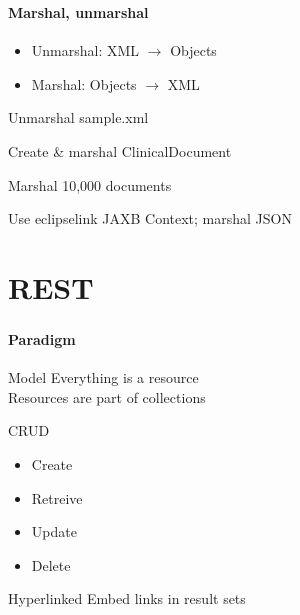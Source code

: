 \documentclass[handout]{beamer}
\begin{document}
\begin{frame}
	\frametitle{\insertsection}
	\framesubtitle{Marshal, unmarshal}
	\begin{definition}
		\begin{itemize}
			\item Unmarshal: XML $\rightarrow$ Objects
			\item Marshal: Objects $\rightarrow$ XML
		\end{itemize}
	\end{definition}
	\begin{semiverbatim}
		Unmarshal sample.xml
	\end{semiverbatim}
	\begin{semiverbatim}
		Create \& marshal ClinicalDocument
	\end{semiverbatim}
	\begin{semiverbatim}
		Marshal 10,000 documents
	\end{semiverbatim}
	\begin{semiverbatim}
		Use eclipselink JAXB Context; marshal JSON
	\end{semiverbatim}
\end{frame}

\section{REST}
\begin{frame}
	\frametitle{\insertsection}
	\framesubtitle{Paradigm}
	\begin{block}{Model}
		Everything is a resource \\
		Resources are part of collections
	\end{block}
	\begin{block}{CRUD}
		\begin{itemize}
			\item Create
			\item Retreive
			\item Update
			\item Delete
		\end{itemize}
	\end{block}
	\begin{block}{Hyperlinked}
		Embed links in result sets
	\end{block}
\end{frame}
\end{document}
